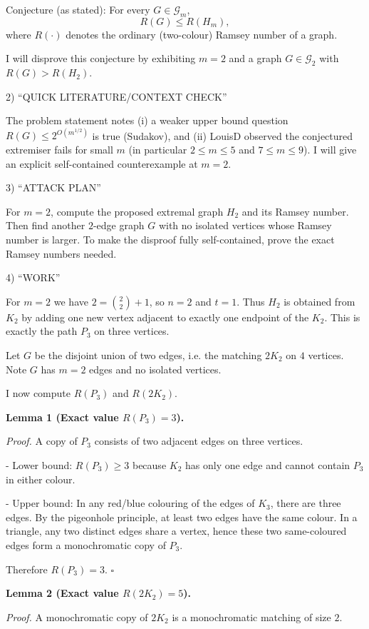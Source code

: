 Conjecture (as stated): For every $G\in\mathcal{G}_m$,
\[
R(G)\le R(H_m),
\]
where $R(\cdot)$ denotes the ordinary (two-colour) Ramsey number of a graph.

I will disprove this conjecture by exhibiting $m=2$ and a graph $G\in\mathcal{G}_2$ with $R(G)>R(H_2)$.

2) “QUICK LITERATURE/CONTEXT CHECK”

The problem statement notes (i) a weaker upper bound question $R(G)\le 2^{O(m^{1/2})}$ is true (Sudakov), and (ii) LouisD observed the conjectured extremiser fails for small $m$ (in particular $2\le m\le 5$ and $7\le m\le 9$). I will give an explicit self-contained counterexample at $m=2$.

3) “ATTACK PLAN”

For $m=2$, compute the proposed extremal graph $H_2$ and its Ramsey number. Then find another $2$-edge graph $G$ with no isolated vertices whose Ramsey number is larger. To make the disproof fully self-contained, prove the exact Ramsey numbers needed.

4) “WORK”

For $m=2$ we have $2=\binom{2}{2}+1$, so $n=2$ and $t=1$. Thus $H_2$ is obtained from $K_2$ by adding one new vertex adjacent to exactly one endpoint of the $K_2$. This is exactly the path $P_3$ on three vertices.

Let $G$ be the disjoint union of two edges, i.e. the matching $2K_2$ on $4$ vertices. Note $G$ has $m=2$ edges and no isolated vertices.

I now compute $R(P_3)$ and $R(2K_2)$.

\textbf{Lemma 1 (Exact value $R(P_3)=3$).}

\emph{Proof.}
A copy of $P_3$ consists of two adjacent edges on three vertices.

- Lower bound: $R(P_3)\ge 3$ because $K_2$ has only one edge and cannot contain $P_3$ in either colour.

- Upper bound: In any red/blue colouring of the edges of $K_3$, there are three edges. By the pigeonhole principle, at least two edges have the same colour. In a triangle, any two distinct edges share a vertex, hence these two same-coloured edges form a monochromatic copy of $P_3$.

Therefore $R(P_3)=3$. $\square$

\textbf{Lemma 2 (Exact value $R(2K_2)=5$).}

\emph{Proof.}
A monochromatic copy of $2K_2$ is a monochromatic matching of size $2$.

